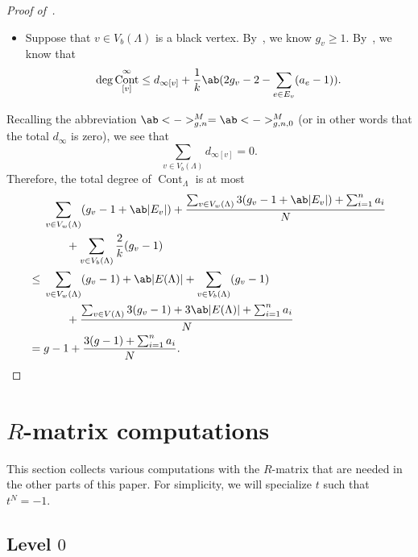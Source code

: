 \documentclass[10pt]{amsart}
\DeclarePairedDelimiter{\ceil}{\lceil}{\rceil}
\theoremstyle{definition}
\theoremstyle{remark}
\theoremstyle{plain}
\theoremstyle{definition}
\theoremstyle{remark}
\newcommand{\1}{\mathbf{1}}
\newcommand{\2}{\mathbf{2}}
\newcommand{\3}{\mathbf{3}}
\DeclareMathOperator{\Cont}{Cont}
\numberwithin{equation}{section}
\begin{document}
\begin{proof}[Proof of~]
\begin{itemize}
\begin{itemize}
\begin{align*}
                        \end{align*}
                    \item If $v$ has two edges, then the precise statement of~ implies (by degree reasons) that the unstable $[0,1]$ correlator has degree at most
                        \[ \ceil{\frac{a_{e_1}}{k}} + \ceil{\frac{a_{e_2}}{k}} - 1 \leq \frac{a_{e_1}-1}{k} + \frac{a_{e_2}-1}{k} + 1 + \frac{3}{N}. \]
                \end{itemize}
            \item Suppose that $v \in V_b(\Lambda)$ is a black vertex. By~, we know $g_v \geq 1$. By~, we know that
                \[ \deg \Cont_{[v]}^{\infty} \leq d_{\infty[v]} + \frac{1}{k}\ab(2g_v-2-\sum_{e \in E_v}(a_e-1)). \]
        \end{itemize}
        Recalling the abbreviation $\ab<->_{g,n}^{M} = \ab<->_{g,n,0}^M$ (or in other words that the total $d_{\infty}$ is zero), we see that
        \[ \sum_{v \in V_b(\Lambda)} d_{\infty[v]} = 0. \]
        Therefore, the total degree of $\Cont_{\Lambda}$ is at most
        \begin{align*}
            &\sum_{v \in V_w(\Lambda)} (g_v-1 + \ab|E_v|) + \frac{\sum_{v \in V_w(\Lambda)} 3(g_v-1 + \ab|E_v|) + \sum_{i=1}^n a_i}{N} \\
            &\qquad + \sum_{v \in V_b(\Lambda)} \frac{2}{k}(g_v-1) \\
            \leq {}& \sum_{v \in V_w(\Lambda)} (g_v-1) + \ab|E(\Lambda)| + \sum_{v\in V_b(\Lambda)} (g_v-1) \\
            &\qquad + \frac{\sum_{v \in V(\Lambda)} 3(g_v-1) + 3\ab|E(\Lambda)| + \sum_{i=1}^n a_i}{N} \\
            ={}& g-1 + \frac{3(g-1) + \sum_{i=1}^n a_i}{N}. \qedhere
        \end{align*}
\end{proof}


\section{$R$-matrix computations}%
\label{sec:Computation of the R-matrix}

This section collects various computations with the $R$-matrix that are needed in the other parts of this paper. For simplicity, we will specialize $t$ such that $t^N = -1$.

\subsection{Level $0$}%
\label{sub:The R matrix at level 0}
\end{document}
